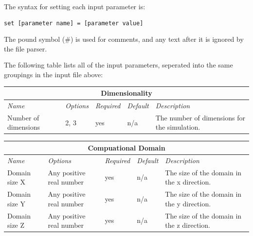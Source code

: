 \documentclass[10pt]{article} %
\begin{document}
The syntax for setting each input parameter is:
\begin{lstlisting}
set [parameter name] = [parameter value]
\end{lstlisting}
 The pound symbol (\#) is used for comments, and any text after it is ignored by the file parser.
 
 The following table lists all of the input parameters, seperated into the same groupings in the input file above:
 \footnotesize
 \renewcommand{\arraystretch}{1.5}
 \begin{center}
    \begin{tabular}{ | p{} | p{} | p{} | p{} | p{} |}
    \hline
      \multicolumn{5}{|c|}{\textbf{Dimensionality}} \\
    \hline
    \hline
    \emph{Name} & \emph{Options} & \emph{Required} & \emph{Default} & \emph{Description} \\ \hline
    Number of dimensions & 2, 3 & yes & n/a & The number of dimensions for the simulation.  \\ \hline
    \end{tabular}
\end{center}

\begin{center}
    \begin{tabular}{ | p{} | p{} | p{} | p{} | p{} |}
    \hline
      \multicolumn{5}{|c|}{\textbf{Compuational Domain}} \\
    \hline
    \hline
    \emph{Name} & \emph{Options} & \emph{Required} & \emph{Default} & \emph{Description} \\ \hline
    Domain size X & Any positive real number & yes & n/a & The size of the domain in the x direction. \\ \hline
     Domain size Y & Any positive real number & yes & n/a & The size of the domain in the y direction. \\ \hline
      Domain size Z & Any positive real number & yes & n/a & The size of the domain in the z direction. \\ \hline
    \end{tabular}
\end{center}
\end{document}
